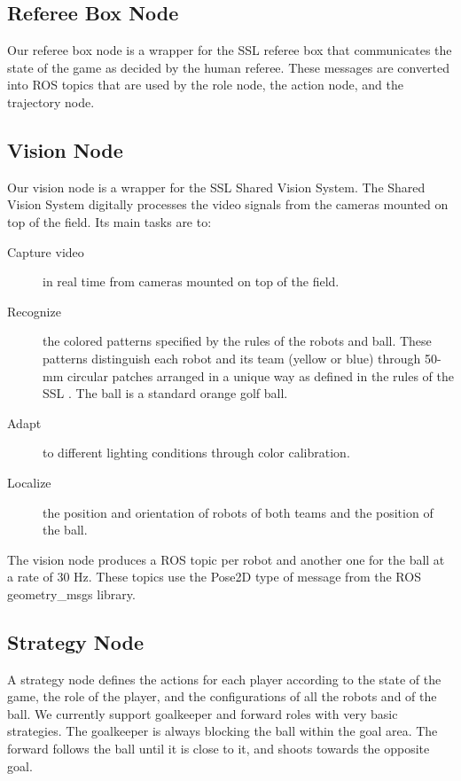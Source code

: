 \documentclass[]{llncs}
\newcommand{\TODO}[1]{{\textcolor{blue}{ToDo: {#1}}}}
\begin{document}


\subsection{Referee Box Node}
Our referee box node is a wrapper for the SSL referee box that communicates the state of the game as decided by
the human referee. These messages are converted into ROS topics that are used by the role node, the action node, and the trajectory node.


\subsection{Vision Node}
Our vision node is a wrapper for the SSL Shared Vision System. The Shared Vision System \cite{zlbwv-sslvtsvsftrcssl-RoboCup-2009} digitally processes the video signals from the cameras mounted on top of the field. Its main tasks are to:
\begin{description}
	\item[Capture video] in real time from cameras mounted on top of the field.
	\item[Recognize] the colored patterns specified by the rules of the robots and ball. These patterns distinguish each robot and its team (yellow or blue) through 50-mm circular patches arranged in a unique way as defined in the rules of the SSL \cite{robocup-ssl-rules}. The ball is a standard orange golf ball.
	\item[Adapt] to different lighting conditions through color calibration.
	\item[Localize] the position and orientation of robots of both teams and the position of the ball.
\end{description}

The vision node produces a ROS topic per robot and another one for the ball at a rate of 30 Hz. These topics use the Pose2D type of message from the ROS geometry\_msgs library. 


\subsection{Strategy Node}
A strategy node defines the actions for each player according to the state of the game, the role of the player, and the configurations of all the robots and of the ball. We currently support goalkeeper and forward roles with very basic strategies. The goalkeeper is always blocking the ball within the goal area. The forward follows the ball until it is close to it, and shoots towards the opposite goal.
\end{document}
